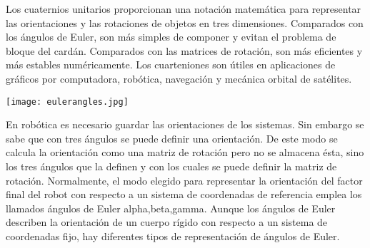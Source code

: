 \documentclass[12pt,letterpaper]{article}
\begin{document}
\begin{flushleft}



Los cuaternios unitarios proporcionan una notación matemática para representar las orientaciones y las rotaciones de objetos en tres dimensiones. Comparados con los ángulos de Euler, son más simples de componer y evitan el problema de bloque del cardán. Comparados con las matrices de rotación, son más eficientes y más estables numéricamente. Los cuarteniones son útiles en aplicaciones de gráficos por computadora, robótica, navegación y mecánica orbital de satélites.
\begin{flushleft}


\texttt{[image: eulerangles.jpg]} 

En robótica es necesario guardar las orientaciones de los sistemas. Sin embargo se sabe que con tres ángulos se puede definir una orientación. De este modo se calcula la orientación como una matriz de rotación pero no se almacena ésta, sino los tres ángulos que la definen y con los cuales se puede definir la matriz de rotación. Normalmente, el modo elegido para representar la orientación del factor final del robot con respecto a un sistema de coordenadas de referencia emplea los llamados ángulos de Euler alpha,beta,gamma. Aunque los ángulos de Euler describen la orientación de un cuerpo rígido con respecto a un sistema de coordenadas fijo, hay diferentes tipos de representación de ángulos de Euler.

\end{flushleft}
\end{flushleft}
\end{document}
